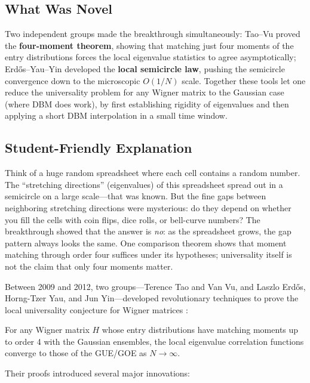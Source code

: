 \subsection{What Was Novel}
Two independent groups made the breakthrough simultaneously: Tao--Vu proved the \textbf{four-moment theorem}, showing that matching just four moments of the entry distributions forces the local eigenvalue statistics to agree asymptotically; Erdős--Yau--Yin developed the \textbf{local semicircle law}, pushing the semicircle convergence down to the microscopic $O(1/N)$ scale. Together these tools let one reduce the universality problem for any Wigner matrix to the Gaussian case (where DBM does work), by first establishing rigidity of eigenvalues and then applying a short DBM interpolation in a small time window.

\subsection{Student-Friendly Explanation}
Think of a huge random spreadsheet where each cell contains a random number. The ``stretching directions'' (eigenvalues) of this spreadsheet spread out in a semicircle on a large scale---that was known. But the fine gaps between neighboring stretching directions were mysterious: do they depend on whether you fill the cells with coin flips, dice rolls, or bell-curve numbers? The breakthrough showed that the answer is \emph{no}: as the spreadsheet grows, the gap pattern always looks the same. One comparison theorem shows that moment matching through order four suffices under its hypotheses; universality itself is not the claim that only four moments matter.

Between 2009 and 2012, two groups---Terence Tao and Van Vu, and Laszlo Erdős, Horng-Tzer Yau, and Jun Yin---developed revolutionary techniques to prove the local universality conjecture for Wigner matrices \cite{erdos2012, taovu2011}:

\begin{theorem}
For any Wigner matrix $H$ whose entry distributions have matching moments up to order 4 with the Gaussian ensembles, the local eigenvalue correlation functions converge to those of the GUE/GOE as $N \to \infty$.
\end{theorem}

Their proofs introduced several major innovations:

